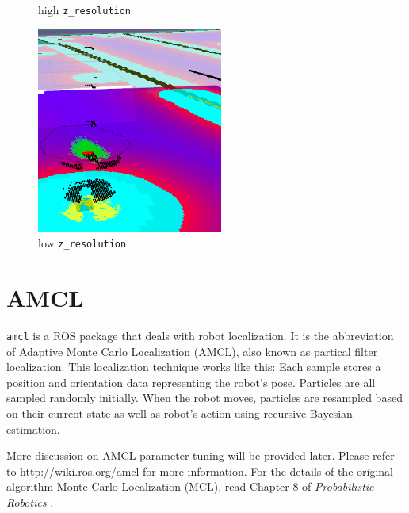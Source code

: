 \documentclass[12pt]{article}
\begin{document}
\begin{figure}[!h]
  \caption{high \texttt{z\_resolution}}
\endminipage\hfill
{}
  \includegraphics[width=\linewidth]{voxellayerparam2.png}
  \caption{low \texttt{z\_resolution}}
\endminipage\hfill
\end{figure}

\section{AMCL}

\texttt{amcl} is a ROS package that deals with robot localization. It is the abbreviation of Adaptive Monte Carlo Localization (AMCL), also known as partical filter localization. This localization technique works like this: Each sample stores a position and orientation data representing the robot's pose. Particles are all sampled randomly initially. When the robot moves, particles are resampled based on their current state as well as robot's action using recursive Bayesian estimation.

More discussion on AMCL parameter tuning will be provided later. Please refer to \url{http://wiki.ros.org/amcl} for more information. For the details of the original algorithm Monte Carlo Localization (MCL), read Chapter 8 of \textit{Probabilistic Robotics} \cite{thrun2005probabilistic}.\\
\end{document}
